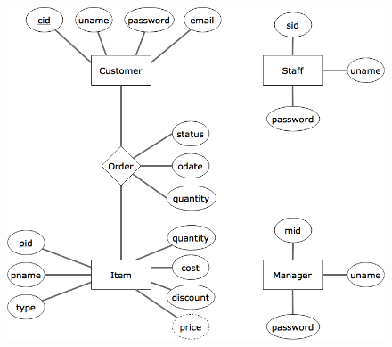 \documentclass[letterpaper]{article}
\begin{document}
\begin{figure}[H]
\centering
\includegraphics[width=\textwidth]{project-schema.png}
\end{figure}



\pagebreak
\end{document}
